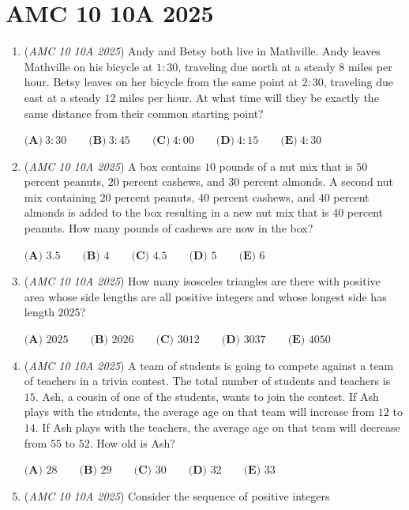 \section{AMC 10 10A 2025}
        \begin{enumerate}
        	\item (\textit{AMC 10 10A 2025}) Andy and Betsy both live in Mathville. Andy leaves Mathville on his bicycle at $1:30$, traveling due north at a steady $8$ miles per hour. Betsy leaves on her bicycle from the same point at $2:30$, traveling due east at a steady $12$ miles per hour. At what time will they be exactly the same distance from their common starting point?


 $\textbf{(A)}~3:30\qquad\textbf{(B)}~3:45\qquad\textbf{(C)}~4:00\qquad\textbf{(D)}~4:15\qquad\textbf{(E)}~4:30$


	\item (\textit{AMC 10 10A 2025}) A box contains $10$ pounds of a nut mix that is $50$ percent peanuts, $20$ percent cashews, and $30$ percent almonds. A second nut mix containing $20$ percent peanuts, $40$ percent cashews, and $40$ percent almonds is added to the box resulting in a new nut mix that is $40$ percent peanuts. How many pounds of cashews are now in the box? 


 $\textbf{(A) } 3.5 \qquad\textbf{(B) } 4 \qquad\textbf{(C) } 4.5 \qquad\textbf{(D) } 5 \qquad\textbf{(E) } 6$


	\item (\textit{AMC 10 10A 2025}) How many isosceles triangles are there with positive area whose side lengths are all positive integers and whose longest side has length $2025$?    


 $\textbf{(A) } 2025 \qquad\textbf{(B) } 2026 \qquad\textbf{(C) } 3012 \qquad\textbf{(D) } 3037 \qquad\textbf{(E) } 4050$


	\item (\textit{AMC 10 10A 2025}) A team of students is going to compete against a team of teachers in a trivia contest. The total number of students and teachers is $15$. Ash, a cousin of one of the students, wants to join the contest. If Ash plays with the students, the average age on that team will increase from $12$ to $14.$ If Ash plays with the teachers, the average age on that team will decrease from $55$ to $52$. How old is Ash?


 $\textbf{(A) } 28 \qquad\textbf{(B) } 29 \qquad\textbf{(C) } 30 \qquad\textbf{(D) } 32 \qquad\textbf{(E) } 33$


	\item (\textit{AMC 10 10A 2025}) Consider the sequence of positive integers



\end{enumerate}
